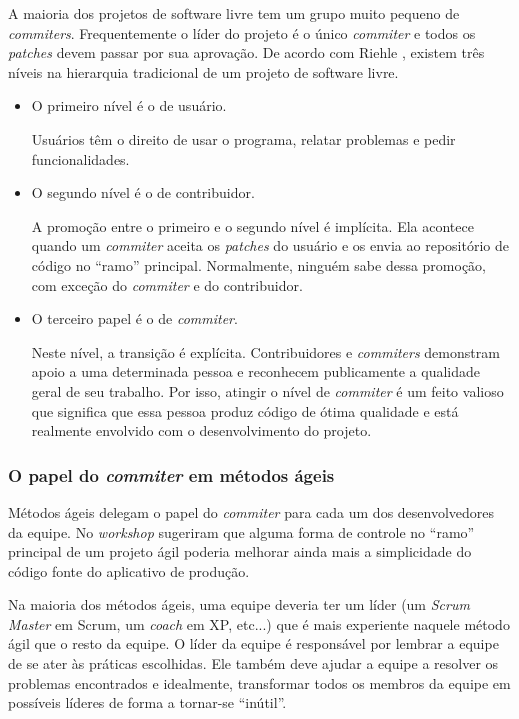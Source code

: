 A maioria dos projetos de software livre tem um grupo muito pequeno de
\emph{commiters}. Frequentemente o líder do projeto é o único
\emph{commiter} e todos os \emph{patches} devem passar por sua
aprovação. De acordo com Riehle \cite{Riehle2007}, existem três níveis
na hierarquia tradicional de um projeto de software livre.
\begin{itemize}
\item O primeiro nível é o de usuário.

  Usuários têm o direito de usar o programa, relatar problemas e pedir
  funcionalidades.
\item O segundo nível é o de contribuidor.

  A promoção entre o primeiro e o segundo nível é implícita. Ela
  acontece quando um \emph{commiter} aceita os \emph{patches} do
  usuário e os envia ao repositório de código no ``ramo''
  principal. Normalmente, ninguém sabe dessa promoção, com exceção do
  \emph{commiter} e do contribuidor.
\item O terceiro papel é o de \emph{commiter}.

  Neste nível, a transição é explícita. Contribuidores e
  \emph{commiters} demonstram apoio a uma determinada pessoa e
  reconhecem publicamente a qualidade geral de seu trabalho. Por isso,
  atingir o nível de \emph{commiter} é um feito valioso que significa
  que essa pessoa produz código de ótima qualidade e está realmente
  envolvido com o desenvolvimento do projeto.
\end{itemize}

\subsubsection{O papel do \emph{commiter} em métodos ágeis}

Métodos ágeis delegam o papel do \emph{commiter} para cada um dos
desenvolvedores da equipe. No \emph{workshop} sugeriram que alguma
forma de controle no ``ramo'' principal de um projeto ágil poderia
melhorar ainda mais a simplicidade do código fonte do aplicativo de
produção.

Na maioria dos métodos ágeis, uma equipe deveria ter um líder (um
\emph{Scrum Master} em Scrum, um \emph{coach} em XP, etc...)  que é
mais experiente naquele método ágil que o resto da equipe. O líder da
equipe é responsável por lembrar a equipe de se ater às práticas
escolhidas. Ele também deve ajudar a equipe a resolver os problemas
encontrados e idealmente, transformar todos os membros da equipe em
possíveis líderes de forma a tornar-se ``inútil''.


